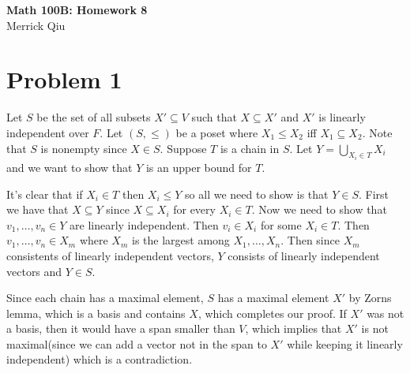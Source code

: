 \documentclass{article}
\begin{document}
\begin{center}
	\huge{\bf Math 100B: Homework 8} \\
	Merrick Qiu
\end{center}

\section*{Problem 1}
Let $S$ be the set of all subsets $X'\subseteq V$ such that 
$X \subseteq X'$ and $X'$ is linearly independent over $F$.
Let $(S,\leq)$ be a poset where $X_1 \leq X_2$ iff $X_1 \subseteq X_2$.
Note that $S$ is nonempty since $X \in S$.
Suppose $T$ is a chain in $S$.
Let $Y = \bigcup_{X_i \in T} X_i$ and we want to show that $Y$
is an upper bound for $T$.

It's clear that if $X_i \in T$ then $X_i \leq Y$ so 
all we need to show is that $Y \in S$.
First we have that $X \subseteq Y$ since $X \subseteq X_i$
for every $X_i \in T$. 
Now we need to show that $v_1,\ldots,v_n \in Y$ are linearly independent.
Then $v_i \in X_i$ for some $X_i \in T$.
Then $v_1,\ldots, v_n \in X_m$ where $X_m$ 
is the largest among $X_1,\ldots, X_n$.
Then since $X_m$ consistents of linearly independent vectors,
$Y$ consists of linearly independent vectors and $Y \in S$.

Since each chain has a maximal element, $S$
has a maximal element $X'$ by Zorns lemma,
which is a basis and contains $X$, which completes our proof.
If $X'$ was not a basis, then it would have a span 
smaller than $V$, which implies that $X'$ is not maximal(since
we can add a vector not in the span to $X'$ while keeping it linearly independent) 
which is a contradiction.
\newpage 
\end{document}
